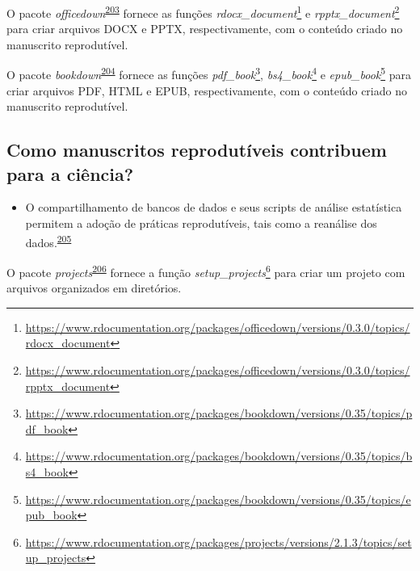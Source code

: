 \documentclass[
  a4paper,
]{book}
\providecommand{\tightlist}{%
  \setlength{\itemsep}{0pt}\setlength{\parskip}{0pt}}
\renewcommand{\href}[2]{#2\footnote{\url{#1}}}
\newenvironment{infobox}[1]
  {
  \begin{itemize}
  \renewcommand{\labelitemi}{
    \raisebox{-.7\height}[0pt][0pt]{
      {\setkeys{Gin}{width=3em,keepaspectratio}
        \texttt{[image: \#1]}}
    }
  }
  \setlength{\fboxsep}{1em}
  \begin{blackbox}
  \item
  }
  {
  \end{blackbox}
  \end{itemize}
  }
\begin{document}
\begin{infobox}{images/Rlogo}
O pacote \emph{officedown}\textsuperscript{\protect\hyperlink{ref-officedown}{203}} fornece as funções \href{https://www.rdocumentation.org/packages/officedown/versions/0.3.0/topics/rdocx_document}{\emph{rdocx\_document}} e \href{https://www.rdocumentation.org/packages/officedown/versions/0.3.0/topics/rpptx_document}{\emph{rpptx\_document}} para criar arquivos DOCX e PPTX, respectivamente, com o conteúdo criado no manuscrito reprodutível.

\end{infobox}

\begin{infobox}{images/Rlogo}
O pacote \emph{bookdown}\textsuperscript{\protect\hyperlink{ref-bookdown}{204}} fornece as funções \href{https://www.rdocumentation.org/packages/bookdown/versions/0.35/topics/pdf_book}{\emph{pdf\_book}}, \href{https://www.rdocumentation.org/packages/bookdown/versions/0.35/topics/bs4_book}{\emph{bs4\_book}} e \href{https://www.rdocumentation.org/packages/bookdown/versions/0.35/topics/epub_book}{\emph{epub\_book}} para criar arquivos PDF, HTML e EPUB, respectivamente, com o conteúdo criado no manuscrito reprodutível.

\end{infobox}

\hypertarget{como-manuscritos-reprodutuxedveis-contribuem-para-a-ciuxeancia}{%
\subsection{Como manuscritos reprodutíveis contribuem para a ciência?}\label{como-manuscritos-reprodutuxedveis-contribuem-para-a-ciuxeancia}}

\begin{itemize}
\tightlist
\item
  O compartilhamento de bancos de dados e seus scripts de análise estatística permitem a adoção de práticas reprodutíveis, tais como a reanálise dos dados.\textsuperscript{\protect\hyperlink{ref-ioannidis2014}{205}}
\end{itemize}

\begin{infobox}{images/Rlogo}
O pacote \emph{projects}\textsuperscript{\protect\hyperlink{ref-projects}{206}} fornece a função \href{https://www.rdocumentation.org/packages/projects/versions/2.1.3/topics/setup_projects}{\emph{setup\_projects}} para criar um projeto com arquivos organizados em diretórios.

\end{infobox}
\end{document}
